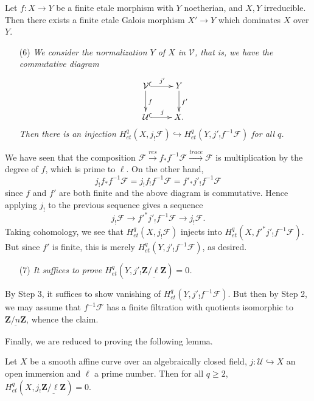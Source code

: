 \begin{exercise}
\label{exercise-finite-etale-under-galois}
Let $f: X \to Y$ be a finite etale morphism with $Y$ noetherian, and $X, Y$
irreducible. Then there exists a finite etale Galois morphism $X' \to Y$
which dominates $X$ over $Y$.
\end{exercise}

\begin{enumerate}
\item[(6)]
{\it We consider the normalization $Y$ of $X$ in $\mathcal{V}$, that is, we
have the commutative diagram
$$
\xymatrix{
\mathcal{V} \ar^{f}[d] \ar^{j'}@{^{(}->}[r] & Y \ar^{f'}[d] \\
\mathcal{U} \ar^{j}@{^{(}->}[r] & X.
}
$$
Then there is an injection $H_{et}^q(X, j_!\mathcal{F}) \hookrightarrow
H_{et}^q(Y, j'_! f^{-1} \mathcal{F})$ for all $q$.}
\end{enumerate}
We have seen that the composition $\mathcal{F} \xrightarrow{res} f_* f^{-1}
\mathcal{F} \xrightarrow{trace} \mathcal{F}$ is multiplication by the degree of
$f$, which is prime to $\ell$. On the other hand,
$$
j_! f_* f^{-1} \mathcal{F} = j_! f_! f^{-1} \mathcal{F} = f'_* j'_!
f^{-1}\mathcal{F}
$$
since $f$ and $f'$ are both finite and the above diagram is commutative. Hence
applying $j_!$ to the previous sequence gives a sequence
$$
j_! \mathcal{F} \longrightarrow f'^* j'_! f^{-1} \mathcal{F} \longrightarrow
j_! \mathcal{F}.
$$
Taking cohomology, we see that $H_{et}^q(X, j_!\mathcal{F})$ injects into
$H_{et}^q( X , f'^* j'_! f^{-1} \mathcal{F})$. But since $f'$ is finite, this
is merely $H_{et}^q( Y, j'_! f^{-1} \mathcal{F})$, as desired.
\begin{enumerate}
\item[(7)]
{\it It suffices to prove $H_{et}^q (Y, j'_!
\underline{\mathbf{Z}/\ell\mathbf{Z}}) = 0$.}
\end{enumerate}
By Step 3, it suffices to show vanishing of $H_{et}^q( Y, j'_! f^{-1}
\mathcal{F})$. But then by Step 2, we may assume that $f^{-1}\mathcal{F}$ has a
finite filtration with quotients isomorphic to
$\underline{\mathbf{Z}/n\mathbf{Z}}$, whence the claim.

\medskip\noindent
Finally, we are reduced to proving the following lemma.

\begin{lemma}
\label{lemma-even-easier}
Let $X$ be a smooth affine curve over an algebraically closed field, $j:
\mathcal{U} \hookrightarrow X$ an open immersion and $\ell$ a prime number.
Then for all $q \geq 2$, $H_{et}^q(X, j_!
\underline{\mathbf{Z}/\ell\mathbf{Z}}) = 0$.
\end{lemma}

